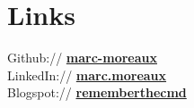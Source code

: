 \documentclass[letterpaper]{deedy-resume} %
\begin{document}
\begin{minipage}[t]{0.33\textwidth}
\section{Links} 

Github:// \href{https://github.com/marc-moreaux}{\bf marc-moreaux} \\
LinkedIn:// \href{https://fr.linkedin.com/pub/marc-moreaux/4b/760/98b}{\bf marc.moreaux} \\
Blogspot:// \href{http://rememberthecmd.blogspot.fr/}{\bf rememberthecmd}

\sectionspace %



\end{minipage} %
\hfill
%
%
\end{document}
